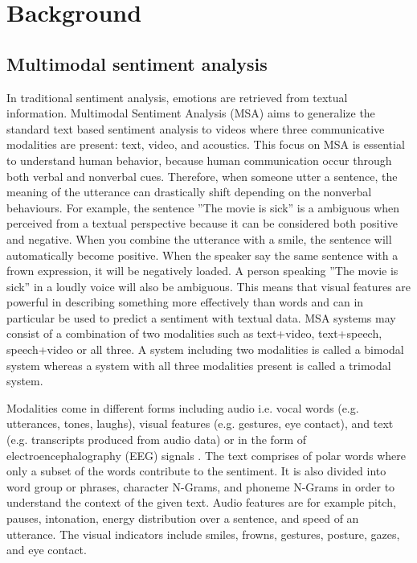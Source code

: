 \chapter{Background}
\label{chap:background}
\section{Multimodal sentiment analysis}
In traditional sentiment analysis, emotions are retrieved from textual information. Multimodal Sentiment Analysis (MSA) aims to generalize the standard text based sentiment analysis to videos where three communicative modalities are present: text, video, and acoustics. This focus on MSA is essential to understand human behavior, because human communication occur through both verbal and nonverbal cues. Therefore, when someone utter a sentence, the meaning of the utterance can drastically shift depending on the nonverbal behaviours. For example, the sentence ''The movie is sick'' is a ambiguous when perceived from a textual perspective because it can be considered both positive and negative. When you combine the utterance with a smile, the sentence will automatically become positive. When the speaker say the same sentence with a frown expression, it will be negatively loaded. A person speaking ''The movie is sick'' in a loudly voice will also be ambiguous. This means that visual features are powerful in describing something more effectively than words and can in particular be used to predict a sentiment with textual data. MSA systems may consist of a combination of two modalities such as text+video, text+speech, speech+video or all three. A system including two modalities is called a bimodal system whereas a system with all three modalities present is called a trimodal system. 

Modalities come in different forms including audio i.e. vocal words (e.g. utterances, tones, laughs), visual features (e.g. gestures, eye contact), and text (e.g. transcripts produced from audio data) or in the form of electroencephalography (EEG) signals \cite{MSA-review-3-9686504}. The text comprises of polar words where only a subset of the words contribute to the sentiment. It is also divided into word group or phrases, character N-Grams, and phoneme N-Grams in order to understand the context of the given text. Audio features are for example pitch, pauses, intonation, energy distribution over a sentence, and speed of an utterance. The visual indicators include smiles, frowns, gestures, posture, gazes, and eye contact. 

